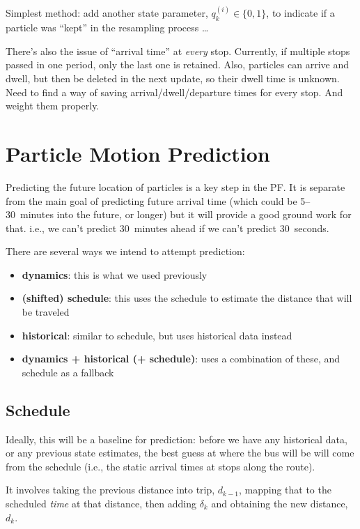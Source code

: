 \documentclass[10pt,a4paper]{article}
\begin{document}
Simplest method: add another state parameter, $q_k^{(i)} \in \{0,1\}$,
to indicate if a particle was ``kept'' in the resampling process \ldots


There's also the issue of ``arrival time'' at \emph{every} stop.
Currently, if multiple stops passed in one period,
only the last one is retained.
Also, particles can arrive and dwell, but then be deleted in the next
update, so their dwell time is unknown.
Need to find a way of saving arrival/dwell/departure times for every stop.
And weight them properly.






\section{Particle Motion Prediction}
\label{sec:particle-prediction}

Predicting the future location of particles is a key step in the PF. 
It is separate from the main goal of predicting future arrival time 
(which could be 5--30~minutes into the future, or longer)
but it will provide a good ground work for that.
i.e., we can't predict 30~minutes ahead if we can't predict 30~seconds.

There are several ways we intend to attempt prediction:
\begin{itemize}
\item \textbf{dynamics}: this is what we used previously
\item \textbf{(shifted) schedule}: this uses the schedule to estimate the distance that will be traveled
\item \textbf{historical}: similar to schedule, but uses historical data instead
\item \textbf{dynamics + historical (+ schedule)}: uses a combination of these, and schedule as a fallback
\end{itemize}


\subsection{Schedule}

Ideally, this will be a baseline for prediction: before we have any historical data,
or any previous state estimates, the best guess at where the bus will be will come from
the schedule (i.e., the static arrival times at stops along the route).

It involves taking the previous distance into trip, $d_{k-1}$, 
mapping that to the scheduled \emph{time} at that distance,
then adding $\delta_k$ and obtaining the new distance, $d_k$.
\end{document}
